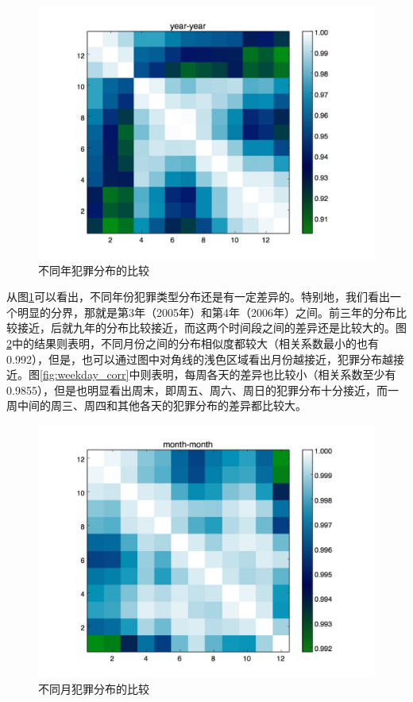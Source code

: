 \begin{figure}[H]
    \centering
    \includegraphics[width=1.0\linewidth]{fig/year_corr}
    \caption{不同年犯罪分布的比较}
    \label{fig:year_corr}
\end{figure}

从图\ref{fig:year_corr}可以看出，不同年份犯罪类型分布还是有一定差异的。特别地，我们看出一个明显的分界，那就是第3年（2005年）和第4年（2006年）之间。前三年的分布比较接近，后就九年的分布比较接近，而这两个时间段之间的差异还是比较大的。图\ref{fig:month_corr}中的结果则表明，不同月份之间的分布相似度都较大（相关系数最小的也有0.992），但是，也可以通过图中对角线的浅色区域看出月份越接近，犯罪分布越接近。图\ref{fig:weekday_corr}中则表明，每周各天的差异也比较小（相关系数至少有0.9855），但是也明显看出周末，即周五、周六、周日的犯罪分布十分接近，而一周中间的周三、周四和其他各天的犯罪分布的差异都比较大。

\begin{figure}[H]
    \centering
    \includegraphics[width=1.0\linewidth]{fig/month_corr}
    \caption{不同月犯罪分布的比较}
    \label{fig:month_corr}
\end{figure}

